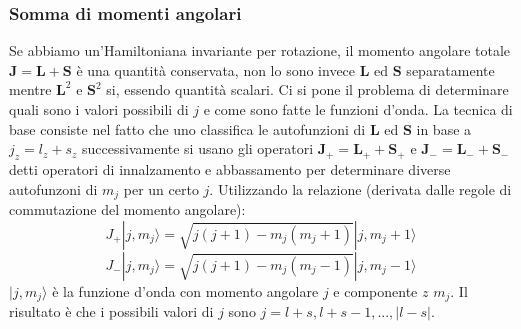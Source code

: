 \subsubsection{Somma di momenti angolari}
Se abbiamo un'Hamiltoniana invariante per rotazione, il momento angolare totale $\mathbf{J}=\mathbf{L}+\mathbf{S}$ è una quantità conservata, non lo sono invece $\mathbf{L}$ ed $\mathbf{S}$ separatamente mentre $\mathbf{L}^2$ e $\mathbf{S}^2$ si, essendo quantità scalari. Ci si pone il problema di determinare quali sono i valori possibili di $j$ e come sono fatte le funzioni d'onda. La tecnica di base consiste nel fatto che uno classifica le autofunzioni di $\mathbf{L}$ ed $\mathbf{S}$ in base a $j_z=l_z+s_z$ successivamente si usano gli operatori $\mathbf{J}_+=\mathbf{L}_++\mathbf{S}_+$ e $\mathbf{J}_-=\mathbf{L}_-+\mathbf{S}_-$ detti operatori di innalzamento e abbassamento per determinare diverse autofunzoni di $m_j$ per un certo $j$. Utilizzando la relazione (derivata dalle regole di commutazione del momento angolare):
\begin{equation*}
    J_+|j,m_j\rangle=\sqrt{j(j+1)-m_j(m_j+1)}|j,m_j+1\rangle
\end{equation*}
\begin{equation*}
    J_-|j,m_j\rangle=\sqrt{j(j+1)-m_j(m_j-1)}|j,m_j-1\rangle
\end{equation*}
$|j,m_j\rangle$ è la funzione d'onda con momento angolare $j$ e componente $z$ $m_j$. Il risultato è che i possibili valori di $j$ sono $j=l+s,l+s-1,...,|l-s|$.
